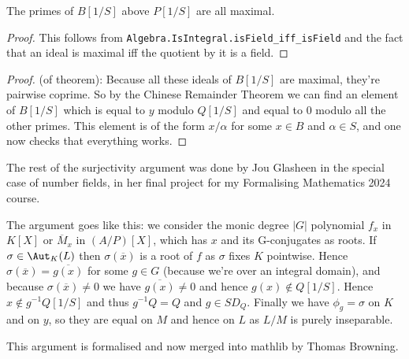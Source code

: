 \begin{lemma}
  \leanok
  The primes of $B[1/S]$ above $P[1/S]$ are all maximal.
\end{lemma}
\begin{proof}
  \leanok
  This follows from {\tt Algebra.IsIntegral.isField\_iff\_isField} and the fact
  that an ideal is maximal iff the quotient by it is a field.
\end{proof}

\begin{proof}(of theorem):
  \leanok
Because all these ideals of $B[1/S]$ are maximal, they're pairwise coprime.
So by the Chinese Remainder Theorem we can find an element of $B[1/S]$ which
is equal to $y$ modulo $Q[1/S]$ and equal to $0$ modulo all the other primes.
This element is of the form $x/\alpha$ for some $x\in B$ and $\alpha\in S$,
and one now checks that everything works.
\end{proof}

The rest of the surjectivity argument was done
by Jou Glasheen in the special case of number fields, in her
final project for my Formalising Mathematics 2024 course.

The argument goes like this: we consider the monic degree $|G|$ polynomial $f_x$ in $K[X]$ or
$\overline{M}_x$ in $(A/P)[X]$,
which has $x$ and its G-conjugates as roots. If $\sigma\in\Aut_K(L)$ then $\sigma(\overline{x})$
is a root of $f$ as $\sigma$ fixes $K$ pointwise. Hence $\sigma(\overline{x})=\overline{g(x)}$
for some $g\in G$ (because we're over an integral domain), and because $\sigma(\overline{x})\not=0$
we have $\overline{g(x)}\not=0$
and hence $g(x)\notin Q[1/S]$. Hence $x\notin g^{-1} Q[1/S]$ and thus $g^{-1}Q=Q$ and $g\in SD_Q$.
Finally we have $\phi_g=\sigma$ on $K$ and on $y$, so they are equal on $M$ and hence on $L$ as
$L/M$ is purely inseparable.

This argument is formalised and now merged into mathlib
by Thomas Browning.
